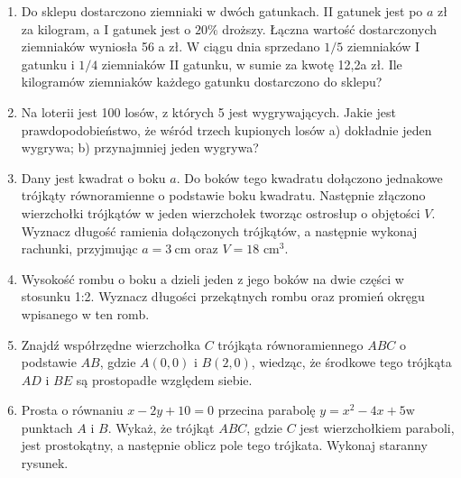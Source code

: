 \documentclass[10pt]{article}
\begin{document}
\begin{enumerate}
  \item Do sklepu dostarczono ziemniaki w dwóch gatunkach. II gatunek jest po $a$ zł za kilogram, a I gatunek jest o $20 \%$ droższy. Łączna wartość dostarczonych ziemniaków wyniosła 56 a zł. W ciągu dnia sprzedano $1 / 5$ ziemniaków I gatunku i $1 / 4$ ziemniaków II gatunku, w sumie za kwotę 12,2a zł. Ile kilogramów ziemniaków każdego gatunku dostarczono do sklepu?
  \item Na loterii jest 100 losów, z których 5 jest wygrywających. Jakie jest prawdopodobieństwo, że wśród trzech kupionych losów a) dokładnie jeden wygrywa; b) przynajmniej jeden wygrywa?
  \item Dany jest kwadrat o boku $a$. Do boków tego kwadratu dołączono jednakowe trójkąty równoramienne o podstawie boku kwadratu. Następnie złączono wierzchołki trójkątów w jeden wierzchołek tworząc ostrosłup o objętości $V$. Wyznacz długość ramienia dołączonych trójkątów, a następnie wykonaj rachunki, przyjmując $a=3 \mathrm{~cm}$ oraz $V=18$ $\mathrm{cm}^{3}$.
  \item Wysokość rombu o boku a dzieli jeden z jego boków na dwie części w stosunku 1:2. Wyznacz długości przekątnych rombu oraz promień okręgu wpisanego w ten romb.
  \item Znajdź współrzędne wierzchołka $C$ trójkąta równoramiennego $A B C$ o podstawie $A B$, gdzie $A(0,0)$ i $B(2,0)$, wiedząc, że środkowe tego trójkąta $A D$ i $B E$ są prostopadłe względem siebie.
  \item Prosta o równaniu $x-2 y+10=0$ przecina parabolę $y=x^{2}-4 x+5 \mathrm{w}$ punktach $A$ i $B$. Wykaż, że trójkąt $A B C$, gdzie $C$ jest wierzchołkiem paraboli, jest prostokątny, a następnie oblicz pole tego trójkata. Wykonaj staranny rysunek.
\end{enumerate}
\end{document}
